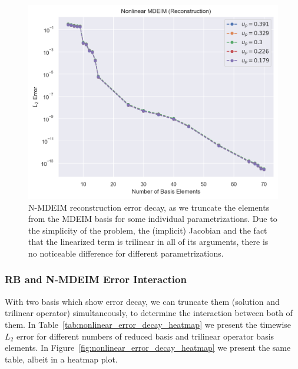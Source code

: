 \documentclass[../../thesis.tex]{subfiles}
\begin{document}
\begin{figure}[h]
    \centering
    \includegraphics[width=1\columnwidth]{research_project/piston/figures/mdeim_certification/nonlinear_error_decay_by_parameter.png}
    \caption{N-MDEIM reconstruction error decay, 
    as we truncate the elements from the MDEIM basis for some individual parametrizations.
    Due to the simplicity of the problem, 
    the (implicit) Jacobian and 
    the fact that the linearized term is trilinear in all of its arguments, 
    there is no noticeable difference for different parametrizations.}
    \label{fig:nonlinear_error_decay_from_fom_by_parameter}
\end{figure}


\subsubsection{RB and N-MDEIM Error Interaction}
\label{sec:reduced_basis_mdeim_error_interaction}
With two basis which show error decay, we can truncate them (solution and trilinear operator)
simultaneously, to determine the interaction between both of them.
In Table~\ref{tab:nonlinear_error_decay_heatmap} we present 
the timewise $L_2$ error for different numbers of reduced basis 
and trilinear operator basis elements.
In Figure~\ref{fig:nonlinear_error_decay_heatmap} we present the same table,
albeit in a heatmap plot. 
\end{document}
